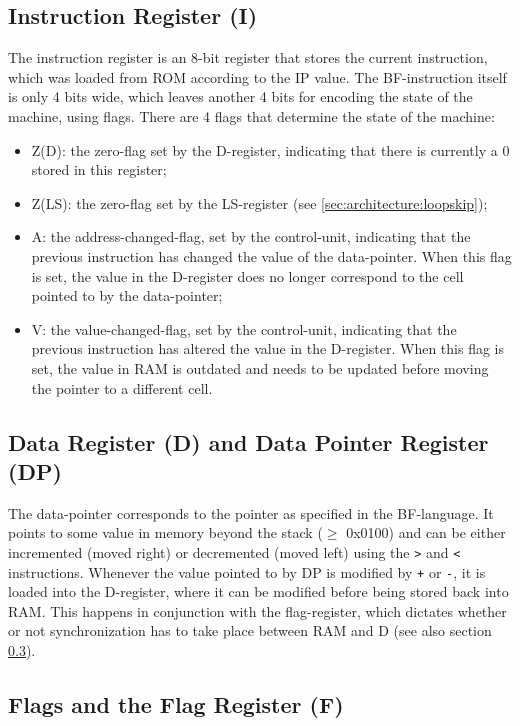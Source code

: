\subsection{Instruction Register (I)} \label{sec:architecture:ireg}
The instruction register is an 8-bit register that stores the current instruction, which was loaded from ROM according to the IP value. The BF-instruction itself is only 4 bits wide, which leaves another 4 bits for encoding the state of the machine, using flags. There are 4 flags that determine the state of the machine:
\begin{itemize}
\item Z(D): the zero-flag set by the D-register, indicating that there is currently a 0 stored in this register;
\item Z(LS): the zero-flag set by the LS-register (see \ref{sec:architecture:loopskip});
\item A: the address-changed-flag, set by the control-unit, indicating that the previous instruction has changed the value of the data-pointer. When this flag is set, the value in the D-register does no longer correspond to the cell pointed to by the data-pointer;
\item V: the value-changed-flag, set by the control-unit, indicating that the previous instruction has altered the value in the D-register. When this flag is set, the value in RAM is outdated and needs to be updated before moving the pointer to a different cell.
\end{itemize}

\subsection{Data Register (D) and Data Pointer Register (DP)} \label{sec:architecture:danddp}
The data-pointer corresponds to the pointer as specified in the BF-language. It points to some value in memory beyond the stack ($\ge$ 0x0100) and can be either incremented (moved right) or decremented (moved left) using the \texttt{>} and \texttt{<} instructions. Whenever the value pointed to by DP is modified by \texttt{+} or \texttt{-}, it is loaded into the D-register, where it can be modified before being stored back into RAM. This happens in conjunction with the flag-register, which dictates whether or not synchronization has to take place between RAM and D (see also section \ref{sec:architecture:flags}).

\subsection{Flags and the Flag Register (F)} \label{sec:architecture:flags}
